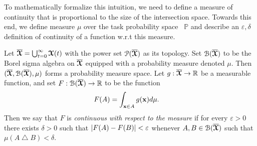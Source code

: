 To mathematically formalize this intuition, we need to define a measure of continuity that is proportional to the size of the intersection space. Towards this end, we define measure $\mu$ over the task probability space ~$\mathbb{P}$ and describe an $\varepsilon, \delta$ definition of 
continuity of a function w.r.t this measure.
\begin{definition} \label{defn:intersect}
     Let $\overline{\boldsymbol{\mathcal{X}}} = \bigcup_{t=0}^\infty \boldsymbol{\mathcal{X}}(t)$ with the power set $\mathcal{P(\overline{\boldsymbol{\mathcal{X}}})}$ as its topology. Set $\mathcal{B(\overline{\boldsymbol{\mathcal{X}}})}$ to be the Borel sigma algebra on $\overline{\boldsymbol{\mathcal{X}}}$ equipped with a probability measure denoted $\mu.$ Then $(\overline{\boldsymbol{\mathcal{X}}},\mathcal{B}(\overline{\boldsymbol{\mathcal{X}}}), \mu)$ forms a probability measure space. Let $g: \overline{\boldsymbol{\mathcal{X}}}\rightarrow \mathbb{R}$ be a measurable function, and set $F:\mathcal{B}(\overline{\boldsymbol{\mathcal{X}}})\rightarrow \mathbb{R}$ to be the function
     \begin{align*}
         F(A) & = \int_{\boldsymbol{\mathrm{x}} \in A} g(\boldsymbol{\mathrm{x}}) d\mu.
     \end{align*}
     Then we say that $F$ is \textit{continuous with respect to the measure} if for every $\varepsilon>0$ there exists $\delta >0$ such that $\lvert F(A)-F(B) \rvert < \varepsilon$
     whenever $A,B\in \mathcal{B(\overline{\boldsymbol{\mathcal{X}}})}$ such that $\mu(A\bigtriangleup B)<\delta.$
 \end{definition}
 

